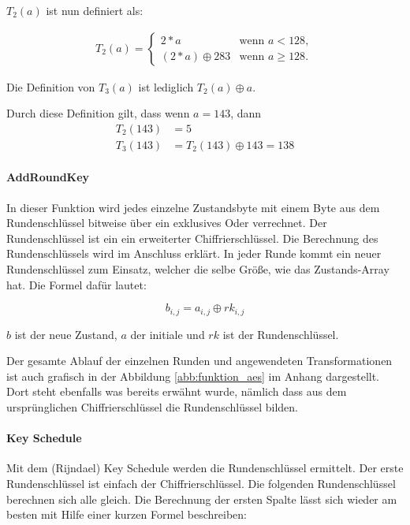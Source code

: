     $T_2(a)$ ist nun definiert als:
    
    \begin{equation*}
     \begin{aligned}
     T_2(a) = \begin{cases}
      2 * a 		 & \text{wenn $a < 128$},\\
      (2*a) \oplus 283 & \text{wenn $a \geq 128$}.
     \end{cases}
     \end{aligned}
    \end{equation*}
    
    Die Definition von $T_3(a)$ ist lediglich $T_2(a) \oplus a$.
    
    Durch diese Definition gilt, dass wenn $a = 143$, dann
    \begin{equation*}
     \begin{aligned}
     T_2(143) &= 5 \\
     T_3(143) &= T_2(143) \oplus 143 = 138
     \end{aligned}
    \end{equation*}
   
  \paragraph{AddRoundKey}
   In dieser Funktion wird jedes einzelne Zustandsbyte mit einem Byte aus dem Rundenschlüssel bitweise über
   ein exklusives Oder verrechnet. Der Rundenschlüssel ist ein ein erweiterter Chiffrierschlüssel. Die Berechnung
   des Rundenschlüssels wird im Anschluss erklärt. In jeder Runde kommt ein neuer Rundenschlüssel zum
   Einsatz, welcher die selbe Größe, wie das Zustands-Array hat. Die Formel dafür lautet:
   
   \begin{equation*}
    b_{i,j} = a_{i,j} \oplus rk_{i,j}
   \end{equation*}
   
   $b$ ist der neue Zustand, $a$ der initiale und $rk$ ist der Rundenschlüssel.
   
   Der gesamte Ablauf der einzelnen Runden und angewendeten Transformationen ist auch grafisch in der
   Abbildung \ref{abb:funktion_aes} im Anhang dargestellt. Dort steht ebenfalls was bereits erwähnt wurde,
   nämlich dass aus dem ursprünglichen Chiffrierschlüssel die Rundenschlüssel bilden.
   
  \paragraph{Key Schedule}
   Mit dem (Rijndael) Key Schedule werden die Rundenschlüssel ermittelt. Der erste Rundenschlüssel ist
   einfach der Chiffrierschlüssel. Die folgenden Rundenschlüssel berechnen sich alle gleich. Die Berechnung der
   ersten Spalte lässt sich wieder am besten mit Hilfe einer kurzen Formel beschreiben:
   
